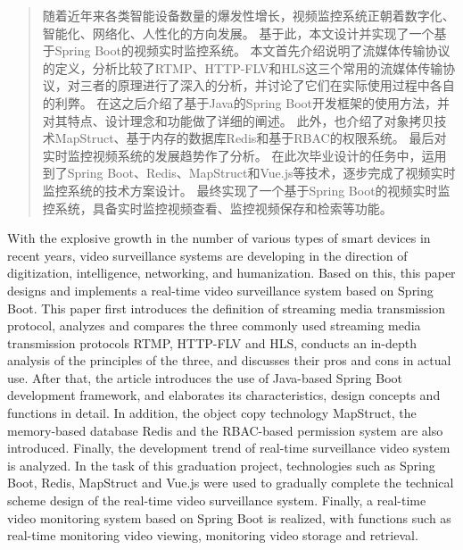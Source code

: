 \begin{abstract}
  随着近年来各类智能设备数量的爆发性增长，视频监控系统正朝着数字化、智能化、网络化、人性化的方向发展。
  基于此，本文设计并实现了一个基于Spring Boot的视频实时监控系统。
  本文首先介绍说明了流媒体传输协议的定义，分析比较了RTMP、HTTP-FLV和HLS这三个常用的流媒体传输协议，对三者的原理进行了深入的分析，并讨论了它们在实际使用过程中各自的利弊。
  在这之后介绍了基于Java的Spring Boot开发框架的使用方法，并对其特点、设计理念和功能做了详细的阐述。
  此外，也介绍了对象拷贝技术MapStruct、基于内存的数据库Redis和基于RBAC的权限系统。
  最后对实时监控视频系统的发展趋势作了分析。
  在此次毕业设计的任务中，运用到了Spring Boot、Redis、MapStruct和Vue.js等技术，逐步完成了视频实时监控系统的技术方案设计。
  最终实现了一个基于Spring Boot的视频实时监控系统，具备实时监控视频查看、监控视频保存和检索等功能。

\end{abstract}

\begin{enabstract}

  With the explosive growth in the number of various types of smart devices in recent years, video surveillance systems are developing in the direction of digitization, intelligence, networking, and humanization.
  Based on this, this paper designs and implements a real-time video surveillance system based on Spring Boot.
  This paper first introduces the definition of streaming media transmission protocol, 
  analyzes and compares the three commonly used streaming media transmission protocols RTMP, HTTP-FLV and HLS, 
  conducts an in-depth analysis of the principles of the three, 
  and discusses their pros and cons in actual use.
  After that, the article introduces the use of Java-based Spring Boot development framework, and elaborates its characteristics, design concepts and functions in detail.
  In addition, the object copy technology MapStruct, the memory-based database Redis and the RBAC-based permission system are also introduced.
  Finally, the development trend of real-time surveillance video system is analyzed.
  In the task of this graduation project, technologies such as Spring Boot, Redis, MapStruct and Vue.js were used to gradually complete the technical scheme design of the real-time video surveillance system.
  Finally, a real-time video monitoring system based on Spring Boot is realized, with functions such as real-time monitoring video viewing, monitoring video storage and retrieval.

\end{enabstract}
